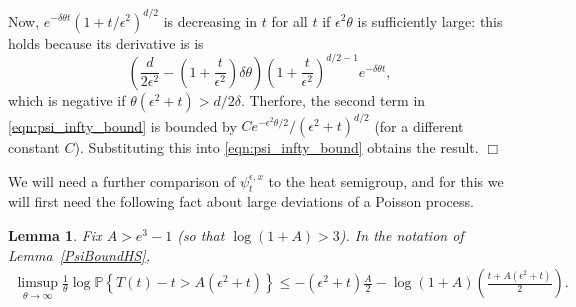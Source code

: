 \documentclass[12pt]{article}
\newenvironment {proof}{{\noindent\bf Proof }}{\hfill $\Box$ \medskip}
\newtheorem{lemma}[theorem]{Lemma}
\newcommand{\IP}{\mathbb P}
\begin{document}
\begin{proof}
\[    \]
    Now, $e^{-\delta \theta t} (1 + t/\epsilon^2)^{d/2}$ is decreasing in $t$
    for all $t$ if $\epsilon^2 \theta$ is sufficiently large:
    this holds because its derivative is
    is
    \[
        \left( \frac{d}{2 \epsilon^2} - \left(1 + \frac{t}{\epsilon^2}\right) \delta \theta \right)
        \left( 1 + \frac{t}{\epsilon^2} \right)^{d/2 - 1} e^{-\delta \theta t} ,
    \]
    which is negative if $\theta(\epsilon^2 + t) > d/2 \delta$.
    Therfore, the second term in \eqref{eqn:psi_infty_bound} 
    is bounded by $C e^{-\epsilon^2 \theta / 2} / (\epsilon^2 + t)^{d/2}$
    (for a different constant $C$).
    Substituting this into \eqref{eqn:psi_infty_bound} obtains the result.
\end{proof}

We will need a further comparison of $\psi_t^{\epsilon,x}$ to the heat semigroup,
and for this we will first need the following fact about large deviations
of a Poisson process.

\begin{lemma}
    \label{lem:poisson_ld}
    Fix $A > e^3 - 1$ (so that $\log(1 + A) > 3$).
    In the notation of Lemma~\ref{PsiBoundHS},
    \begin{align*}
        \limsup_{\theta \to \infty}
        \frac{1}{\theta} \log
        \IP\left\{
            T(t) - t > A(\epsilon^2 + t)
        \right\}
    \le
        - (\epsilon^2 + t) \frac{A}{2}
        - \log(1 + A)\left( \frac{t + A(\epsilon^2 + t)}{2} \right) .
    \end{align*}
\end{lemma}
\end{document}
